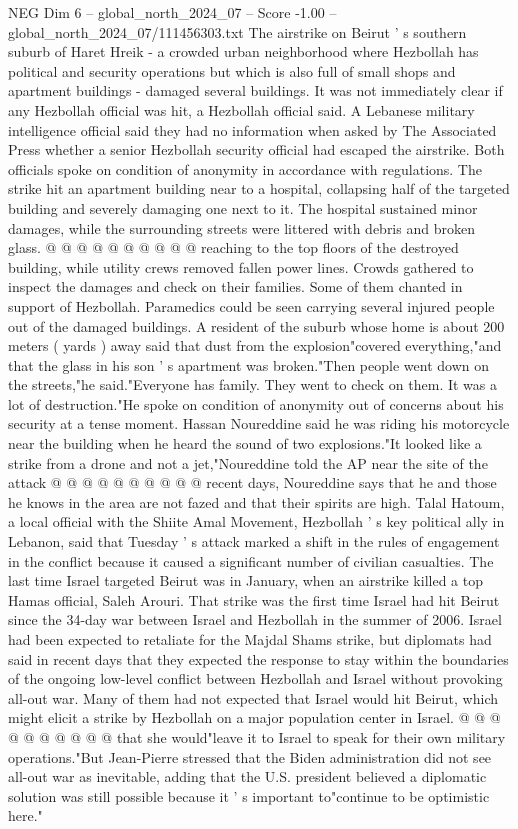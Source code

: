 \begin{textsample}{NEG Dim 6 – global\_north\_2024\_07 – Score -1.00 – global\_north\_2024\_07/111456303.txt}
The airstrike on Beirut ' s southern suburb of Haret Hreik - a crowded urban neighborhood where Hezbollah has political and security operations but which is also full of small shops and apartment buildings - damaged several buildings.
It was not immediately clear if any Hezbollah official was hit, a Hezbollah official said.
A Lebanese military intelligence official said they had no information when asked by The Associated Press whether a senior Hezbollah security official had escaped the airstrike.
Both officials spoke on condition of anonymity in accordance with regulations.
The strike hit an apartment building near to a hospital, collapsing half of the targeted building and severely damaging one next to it.
The hospital sustained minor damages, while the surrounding streets were littered with debris and broken glass. @ @ @ @ @ @ @ @ @ @ reaching to the top floors of the destroyed building, while utility crews removed fallen power lines.
Crowds gathered to inspect the damages and check on their families.
Some of them chanted in support of Hezbollah.
Paramedics could be seen carrying several injured people out of the damaged buildings.
A resident of the suburb whose home is about 200 meters ( yards ) away said that dust from the explosion"covered everything,"and that the glass in his son ' s apartment was broken."Then people went down on the streets,"he said."Everyone has family.
They went to check on them.
It was a lot of destruction."He spoke on condition of anonymity out of concerns about his security at a tense moment.
Hassan Noureddine said he was riding his motorcycle near the building when he heard the sound of two explosions."It looked like a strike from a drone and not a jet,"Noureddine told the AP near the site of the attack @ @ @ @ @ @ @ @ @ @ recent days, Noureddine says that he and those he knows in the area are not fazed and that their spirits are high.
Talal Hatoum, a local official with the Shiite Amal Movement, Hezbollah ' s key political ally in Lebanon, said that Tuesday ' s attack marked a shift in the rules of engagement in the conflict because it caused a significant number of civilian casualties.
The last time Israel targeted Beirut was in January, when an airstrike killed a top Hamas official, Saleh Arouri.
That strike was the first time Israel had hit Beirut since the 34-day war between Israel and Hezbollah in the summer of 2006.
Israel had been expected to retaliate for the Majdal Shams strike, but diplomats had said in recent days that they expected the response to stay within the boundaries of the ongoing low-level conflict between Hezbollah and Israel without provoking all-out war.
Many of them had not expected that Israel would hit Beirut, which might elicit a strike by Hezbollah on a major population center in Israel. @ @ @ @ @ @ @ @ @ @ that she would"leave it to Israel to speak for their own military operations."But Jean-Pierre stressed that the Biden administration did not see all-out war as inevitable, adding that the U.S. president believed a diplomatic solution was still possible because it ' s important to"continue to be optimistic here."

\end{textsample}
